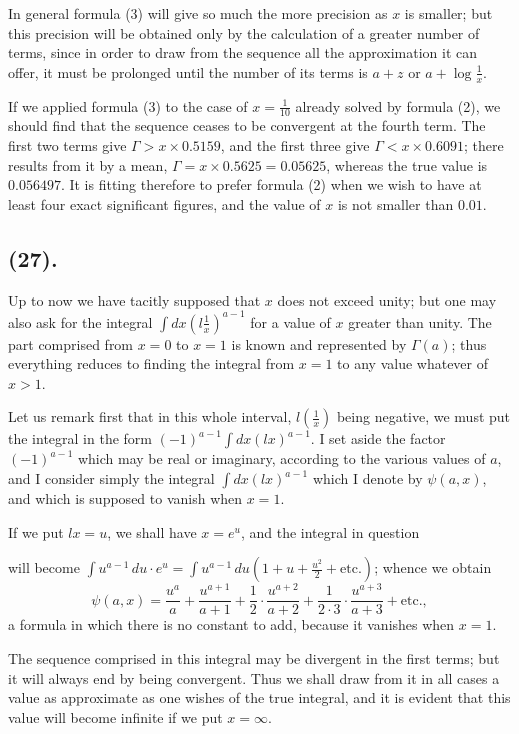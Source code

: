 \documentclass{article}
\begin{document}
In general formula (3) will give so much the more precision as $x$ is smaller; but this precision will be obtained only by the calculation of a greater number of terms, since in order to draw from the sequence all the approximation it can offer, it must be prolonged until the number of its terms is $a+z$ or $a+\log\frac{1}{x}$.

If we applied formula (3) to the case of $x=\frac{1}{10}$ already solved by formula (2), we should find that the sequence ceases to be convergent at the fourth term. The first two terms give $\Gamma>x\times0.5159$, and the first three give $\Gamma<x\times0.6091$; there results from it by a mean, $\Gamma=x\times0.5625=0.05625$, whereas the true value is $0.056497$. It is fitting therefore to prefer formula (2) when we wish to have at least four exact significant figures, and the value of $x$ is not smaller than $0.01$.

\subsection*{(27).}

Up to now we have tacitly supposed that $x$ does not exceed unity; but one may also ask for the integral $\displaystyle\int dx\left(l\frac{1}{x}\right)^{a-1}$ for a value of $x$ greater than unity. The part comprised from $x=0$ to $x=1$ is known and represented by $\Gamma(a)$; thus everything reduces to finding the integral from $x=1$ to any value whatever of $x>1$.

Let us remark first that in this whole interval, $l\left(\frac{1}{x}\right)$ being negative, we must put the integral in the form $(-1)^{a-1}\displaystyle\int dx(lx)^{a-1}$. I set aside the factor $(-1)^{a-1}$ which may be real or imaginary, according to the various values of $a$, and I consider simply the integral $\displaystyle\int dx(lx)^{a-1}$ which I denote by $\psi(a,x)$, and which is supposed to vanish when $x=1$.

If we put $lx=u$, we shall have $x=e^{u}$, and the integral in question

will become $\displaystyle\int u^{a-1}\,du\cdot e^{u}=\displaystyle\int u^{a-1}\,du\left(1+u+\frac{u^{2}}{2}+\text{etc.}\right)$; whence we obtain
\[ \psi(a,x)=\frac{u^{a}}{a}+\frac{u^{a+1}}{a+1}+\frac{1}{2}\cdot\frac{u^{a+2}}{a+2}+\frac{1}{2\cdot3}\cdot\frac{u^{a+3}}{a+3}+\text{etc.}, \tag{4} \]
a formula in which there is no constant to add, because it vanishes when $x=1$.

The sequence comprised in this integral may be divergent in the first terms; but it will always end by being convergent. Thus we shall draw from it in all cases a value as approximate as one wishes of the true integral, and it is evident that this value will become infinite if we put $x=\infty$.
\end{document}
